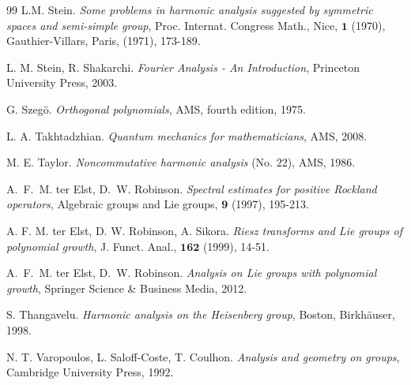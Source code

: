 \documentclass[12pt,oneside,a4paper]{book}
\numberwithin{equation}{section}     %
\theoremstyle{plain}
\theoremstyle{definition}
\begin{document}
\begin{thebibliography}{99}
	L.M. Stein.
	\emph{Some problems in harmonic analysis suggested by symmetric spaces and semi-simple group},
	Proc. Internat. Congress Math., Nice, $\mathbf{1}$ (1970), Gauthier-Villars, Paris, (1971), 173-189.
	
	L. M. Stein, R. Shakarchi.
	\emph{Fourier Analysis - An Introduction},
	Princeton University Press, 2003.
	
	G. Szeg\"o.
	\emph{Orthogonal polynomials}, 
	AMS, fourth edition, 1975. 
	
	L. A. Takhtadzhian.
	\emph{Quantum mechanics for mathematicians},
	AMS, 2008.
	
	
	M. E. Taylor.
	\emph{Noncommutative harmonic analysis} (No. $22$),
	AMS, 1986.
	
	A.~F.~M. ter Elst, D.~W. Robinson.
	\emph{Spectral estimates for positive Rockland operators},
	Algebraic groups and Lie groups, $\mathbf{9}$ (1997), 195-213.
	
	A. F. M. ter Elst, D. W. Robinson, A. Sikora.
	\emph{Riesz transforms and Lie groups of polynomial growth},
	J. Funct. Anal., $\mathbf{162}$ (1999), 14-51.
	
	A.~F.~M. ter Elst, D.~W. Robinson.
	\emph{Analysis on Lie groups with polynomial growth},
	Springer Science \& Business Media, 2012.
	
	S. Thangavelu.
	\emph{Harmonic analysis on the Heisenberg group},
	Boston, Birkh\"auser, 1998.
	
	N. T. Varopoulos, L. Saloff-Coste, T. Coulhon.
	\emph{Analysis and geometry on groups}, Cambridge University Press, 1992. 
	
\end{thebibliography}
 
\end{document}
